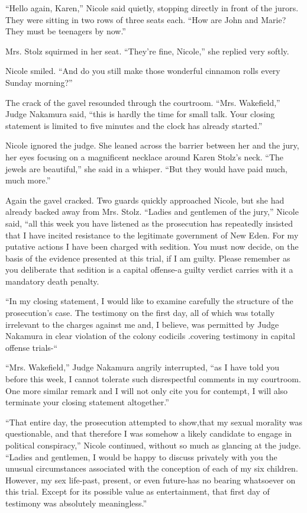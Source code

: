 \documentclass[]{article}
\begin{document}
{{“Hello again, Karen,” Nicole said quietly, stopping directly in front of the jurors.  They were sitting in two rows of three seats each.  “How are John and Marie? They must be teenagers by now.”

Mrs.  Stolz squirmed in her seat.  “They’re fine, Nicole,” she replied very softly.

Nicole smiled.  “And do you still make those wonderful cinnamon rolls every Sunday morning?”

The crack of the gavel resounded through the courtroom.  “Mrs.  Wakefield,” Judge Nakamura said, “this is hardly the time for small talk.  Your closing statement is limited to five minutes and the clock has already started.”

Nicole ignored the judge.  She leaned across the barrier between her and the jury, her eyes focusing on a magnificent necklace around Karen Stolz’s neck.  “The jewels are beautiful,” she said in a whisper.  “But they would have paid much, much more.”

Again the gavel cracked.  Two guards quickly approached Nicole, but she had already backed away from Mrs.  Stolz.  “Ladies and gentlemen of the jury,” Nicole said, “all this week you have listened as the prosecution has repeatedly insisted that I have incited resistance to the legitimate government of New Eden.  For my putative actions I have been charged with sedition.  You must now decide, on the basis of the evidence presented at this trial, if I am guilty.  Please remember as you deliberate that sedition is a capital offense-a guilty verdict carries with it a mandatory death penalty.

“In my closing statement, I would like to examine carefully the structure of the prosecution’s case.  The testimony on the first day, all of which was totally irrelevant to the charges against me and, I believe, was permitted by Judge Nakamura in clear violation of the colony codicils .covering testimony in capital offense trials-“

“Mrs.  Wakefield,” Judge Nakamura angrily interrupted, “as I have told you before this week, I cannot tolerate such disrespectful comments in my courtroom.  One more similar remark and I will not only cite you for contempt, I will also terminate your closing statement altogether.”

“That entire day, the prosecution attempted to show,that my sexual morality was questionable, and that therefore I was somehow a likely candidate to engage in political conspiracy,” Nicole continued, without so much as glancing at the judge.  “Ladies and gentlemen, I would be happy to discuss privately with you the unusual circumstances associated with the conception of each of my six children.  However, my sex life-past, present, or even future-has no bearing whatsoever on this trial.  Except for its possible value as entertainment, that first day of testimony was absolutely meaningless.”

}}
\end{document}
